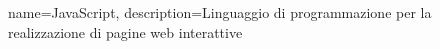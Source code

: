 {
	name={JavaScript},
	description={Linguaggio di programmazione per la realizzazione di pagine web interattive}
}